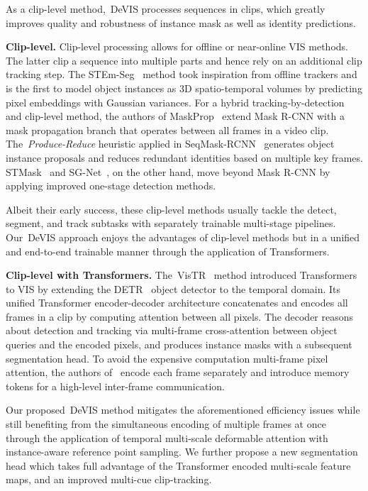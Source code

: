 \documentclass[runningheads]{llncs}
\newcommand{\detr}{\mbox{DETR}}
\newcommand{\vistr}{\mbox{VisTR}}
\newcommand{\evis}{\mbox{DeVIS}}
\begin{document}
As a clip-level method,~\evis{} processes sequences in clips, which greatly improves quality and robustness of instance mask as well as identity predictions.


\noindent \textbf{Clip-level.}
Clip-level processing allows for offline or near-online VIS methods.
The latter clip a sequence into multiple parts and hence rely on an additional clip tracking step.
The STEm-Seg~\cite{stem_seg} method took inspiration from offline trackers and is the first to model object instances as 3D spatio-temporal volumes by predicting pixel embeddings with Gaussian variances.
For a hybrid tracking-by-detection and clip-level method, the authors of MaskProp~\cite{mask_prop} extend Mask R-CNN with a mask propagation branch that operates between all frames in a video clip.
The~\textit{Produce-Reduce} heuristic applied in SeqMask-RCNN~\cite{prop_reduce} generates object instance proposals and reduces redundant identities based on multiple key frames.
STMask~\cite{stmask} and SG-Net~\cite{sg_net}, on the other hand, move beyond Mask R-CNN by applying improved one-stage detection methods.

Albeit their early success, these clip-level methods usually tackle the detect, segment, and track subtasks with separately trainable multi-stage pipelines.
Our~\evis{} approach enjoys the advantages of clip-level methods but in a unified and end-to-end trainable manner through the application of Transformers.

\noindent \textbf{Clip-level with Transformers.}
The~\vistr{}~\cite{vistr} method introduced Transformers~\cite{attention_is_all_you_need} to VIS by extending the \detr{}~\cite{DETR} object detector to the temporal domain.
Its unified Transformer encoder-decoder architecture concatenates and encodes all frames in a clip by computing attention between all pixels.
The decoder reasons about detection and tracking via multi-frame cross-attention between object queries and the encoded pixels, and produces instance masks with a subsequent segmentation head.
To avoid the expensive computation multi-frame pixel attention, the authors of~\cite{IFC} encode each frame separately and introduce memory tokens for a high-level inter-frame communication.


Our proposed~\evis{} method mitigates the aforementioned efficiency issues while still benefiting from the simultaneous encoding of multiple frames at once through the application of temporal multi-scale deformable attention with instance-aware reference point sampling.
We further propose a new segmentation head which takes full advantage of the Transformer encoded multi-scale feature maps, and an improved multi-cue clip-tracking.
\end{document}
